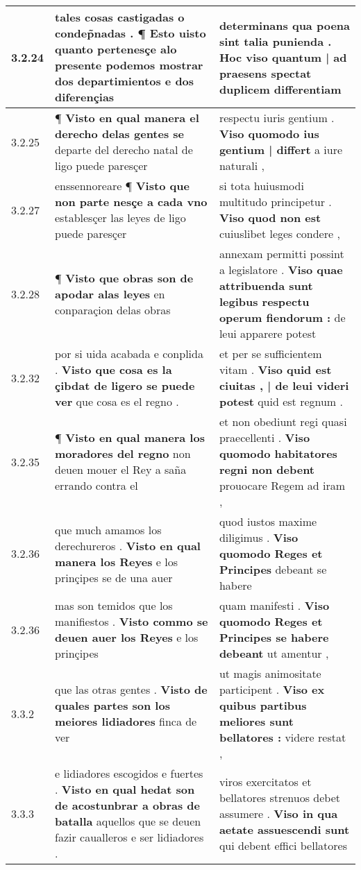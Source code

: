\begin{tabular}{|p{1cm}|p{6.5cm}|p{6.5cm}|}
3.2.24 & tales cosas castigadas o condep̃nadas . \textbf{ ¶ Esto uisto quanto pertenesçe alo presente podemos mostrar dos departimientos } e dos diferençias & determinans qua poena sint talia punienda . \textbf{ Hoc viso quantum | ad praesens spectat } duplicem differentiam \\\hline
3.2.25 & ¶ \textbf{ Visto en qual manera el derecho delas gentes se } departe del derecho natal de ligo puede paresçer & respectu iuris gentium . \textbf{ Viso quomodo ius gentium | differt } a iure naturali , \\\hline
3.2.27 & enssennoreare ¶ \textbf{ Visto que non parte nesçe a cada vno } establesçer las leyes de ligo puede paresçer & si tota huiusmodi multitudo principetur . \textbf{ Viso quod non est } cuiuslibet leges condere , \\\hline
3.2.28 & ¶ \textbf{ Visto que obras son de apodar alas leyes } en conparaçion delas obras & annexam permitti possint a legislatore . \textbf{ Viso quae attribuenda sunt legibus respectu operum fiendorum : } de leui apparere potest \\\hline
3.2.32 & por si uida acabada e conplida . \textbf{ Visto que cosa es la çibdat de ligero se puede ver } que cosa es el regno . & et per se sufficientem vitam . \textbf{ Viso quid est ciuitas , | de leui videri potest } quid est regnum . \\\hline
3.2.35 & ¶ \textbf{ Visto en qual manera los moradores del regno } non deuen mouer el Rey a saña errando contra el & et non obediunt regi quasi praecellenti . \textbf{ Viso quomodo habitatores regni non debent } prouocare Regem ad iram , \\\hline
3.2.36 & que much amamos los derechureros . \textbf{ Visto en qual manera los Reyes } e los prinçipes se de una auer & quod iustos maxime diligimus . \textbf{ Viso quomodo Reges et Principes } debeant se habere \\\hline
3.2.36 & mas son temidos que los manifiestos . \textbf{ Visto commo se deuen auer los Reyes } e los prinçipes & quam manifesti . \textbf{ Viso quomodo Reges et Principes se habere debeant } ut amentur , \\\hline
3.3.2 & que las otras gentes . \textbf{ Visto de quales partes son los meiores lidiadores } finca de ver & ut magis animositate participent . \textbf{ Viso ex quibus partibus meliores sunt bellatores : } videre restat , \\\hline
3.3.3 & e lidiadores escogidos e fuertes . \textbf{ Visto en qual hedat son de acostunbrar a obras de batalla } aquellos que se deuen fazir caualleros e ser lidiadores . & viros exercitatos et bellatores strenuos debet assumere . \textbf{ Viso in qua aetate assuescendi sunt } qui debent effici bellatores \\\hline

\end{tabular}
